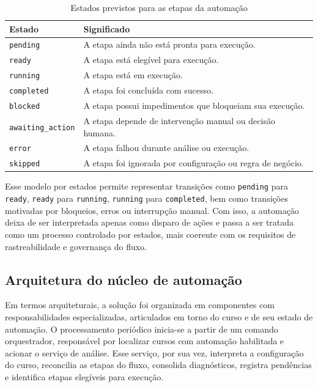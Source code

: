 \begin{table}[H]
\centering
\caption{Estados previstos para as etapas da automação}
\label{tab:estados-etapas-automacao}
\begin{tabular}{p{3.5cm} p{9.5cm}}
\hline
\textbf{Estado} & \textbf{Significado} \\
\hline
\texttt{pending} & A etapa ainda não está pronta para execução. \\
\hline
\texttt{ready} & A etapa está elegível para execução. \\
\hline
\texttt{running} & A etapa está em execução. \\
\hline
\texttt{completed} & A etapa foi concluída com sucesso. \\
\hline
\texttt{blocked} & A etapa possui impedimentos que bloqueiam sua execução. \\
\hline
\texttt{awaiting\_action} & A etapa depende de intervenção manual ou decisão humana. \\
\hline
\texttt{error} & A etapa falhou durante análise ou execução. \\
\hline
\texttt{skipped} & A etapa foi ignorada por configuração ou regra de negócio. \\
\hline
\end{tabular}
\end{table}

Esse modelo por estados permite representar transições como
\texttt{pending} para \texttt{ready}, \texttt{ready} para
\texttt{running}, \texttt{running} para \texttt{completed}, bem como
transições motivadas por bloqueios, erros ou interrupção manual. Com
isso, a automação deixa de ser interpretada apenas como disparo de
ações e passa a ser tratada como um processo controlado por estados,
mais coerente com os requisitos de rastreabilidade e governança do
fluxo.

\subsection{Arquitetura do núcleo de automação}
\label{sec:metod:modelagem:arquitetura}

Em termos arquiteturais, a solução foi organizada em componentes com
responsabilidades especializadas, articulados em torno do curso e de seu
estado de automação. O processamento periódico inicia-se a partir de um
comando orquestrador, responsável por localizar cursos com automação
habilitada e acionar o serviço de análise. Esse serviço, por sua vez,
interpreta a configuração do curso, reconcilia as etapas do fluxo,
consolida diagnósticos, registra pendências e identifica etapas
elegíveis para execução.

